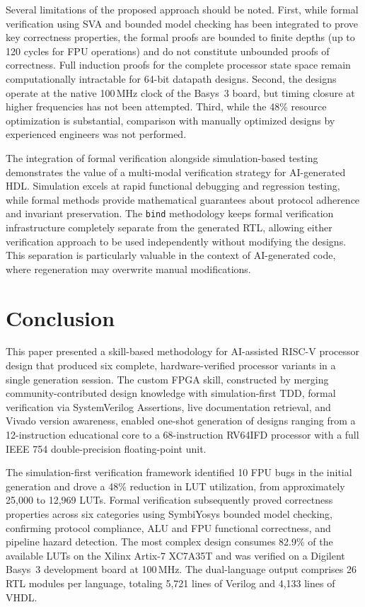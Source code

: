 \documentclass[conference]{IEEEtran}
\begin{document}
Several limitations of the proposed approach should be noted. First, while formal verification using SVA and bounded model checking has been integrated to prove key correctness properties, the formal proofs are bounded to finite depths (up to 120 cycles for FPU operations) and do not constitute unbounded proofs of correctness. Full induction proofs for the complete processor state space remain computationally intractable for 64-bit datapath designs. Second, the designs operate at the native 100\,MHz clock of the Basys~3 board, but timing closure at higher frequencies has not been attempted. Third, while the 48\% resource optimization is substantial, comparison with manually optimized designs by experienced engineers was not performed.

The integration of formal verification alongside simulation-based testing demonstrates the value of a multi-modal verification strategy for AI-generated HDL. Simulation excels at rapid functional debugging and regression testing, while formal methods provide mathematical guarantees about protocol adherence and invariant preservation. The \texttt{bind} methodology keeps formal verification infrastructure completely separate from the generated RTL, allowing either verification approach to be used independently without modifying the designs. This separation is particularly valuable in the context of AI-generated code, where regeneration may overwrite manual modifications.

\section{Conclusion}

This paper presented a skill-based methodology for AI-assisted RISC-V processor design that produced six complete, hardware-verified processor variants in a single generation session. The custom FPGA skill, constructed by merging community-contributed design knowledge with simulation-first TDD, formal verification via SystemVerilog Assertions, live documentation retrieval, and Vivado version awareness, enabled one-shot generation of designs ranging from a 12-instruction educational core to a 68-instruction RV64IFD processor with a full IEEE 754 double-precision floating-point unit.

The simulation-first verification framework identified 10 FPU bugs in the initial generation and drove a 48\% reduction in LUT utilization, from approximately 25,000 to 12,969 LUTs. Formal verification subsequently proved correctness properties across six categories using SymbiYosys bounded model checking, confirming protocol compliance, ALU and FPU functional correctness, and pipeline hazard detection. The most complex design consumes 82.9\% of the available LUTs on the Xilinx Artix-7 XC7A35T and was verified on a Digilent Basys~3 development board at 100\,MHz. The dual-language output comprises 26 RTL modules per language, totaling 5,721 lines of Verilog and 4,133 lines of VHDL.
\end{document}
